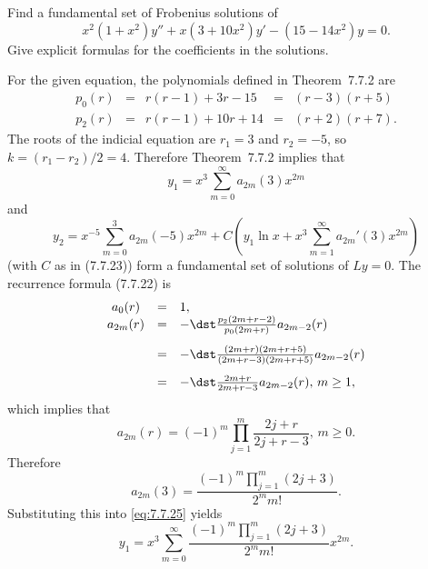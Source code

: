 \setcounter{example}{2}
\begin{example}
  \label{example:7.7.3} \rm Find a fundamental set of Frobenius solutions of
  \[
    x^{2}(1+x^{2})y''+x(3+10x^{2})y'-(15-14x^{2})y=0.
  \]
  Give explicit formulas for the coefficients in the solutions.
\end{example}
\setcounter{equation}{24}
\begin{examplesolution}
\solution For the given equation, the polynomials defined in Theorem~7.7.2 are
\[
  \begin{array}{ccccc}
    p_{0}(r) & = & r(r-1)+3r-15  & = & (r-3)(r+5)  \\[5pt]
    p_{2}(r) & = & r(r-1)+10r+14 & = & (r+2)(r+7).
  \end{array}
\]
The roots of the indicial equation are $r_{1}=3$ and $r_{2}=-5$, so $k=(r_{1}-r_{2})/2=4$. Therefore
Theorem~7.7.2 implies that
\begin{equation}
  \label{eq:7.7.25}y_{1}=x^{3}\sum_{m=0}^{\infty}a_{2m}(3)x^{2m}
\end{equation}
and
\[
  y_{2}=x^{-5}\sum_{m=0}^{3}a_{2m}(-5)x^{2m}+C \left(y_{1}\ln x+x^{3}\sum_{m=1}^{\infty}a_{2m}'(3)x^{2m}\right)
\]
(with $C$ as in \textup{(7.7.23)}) form a fundamental set of solutions of $Ly=0$. The recurrence
formula \textup{(7.7.22)} is
\begin{equation}
  \label{eq:7.7.26}
  \begin{array}{ccl}
    a_{0}(r)  & = & 1,                                                      \\
    a_{2m}(r) & = & -\dst\frac{p_{2}(2m+r-2)}{p_{0}(2m+r)}a_{2m-2}(r)       \\[10pt]
              & = & -\dst\frac{(2m+r)(2m+r+5)}{(2m+r-3)(2m+r+5)}a_{2m-2}(r) \\[10pt]
              & = & -\dst\frac{2m+r}{2m+r-3}a_{2m-2}(r),\,m\ge1,
  \end{array}
\end{equation}
which implies that
\begin{equation}
  \label{eq:7.7.27}a_{2m}(r)=(-1)^{m}\prod_{j=1}^{m}\frac{2j+r}{2j+r-3},\,m\ge0.
\end{equation}
Therefore
\begin{equation}
  \label{eq:7.7.28}a_{2m}(3)=\frac{(-1)^{m}\prod_{j=1}^{m}(2j+3)}{2^{m}m!}.
\end{equation}
Substituting this into \eqref{eq:7.7.25} yields
\[
  y_{1}=x^{3}\sum_{m=0}^{\infty}\frac{(-1)^{m}\prod_{j=1}^{m}(2j+3)}{2^{m}m!}x^{2m}.
\]


\end{examplesolution}
